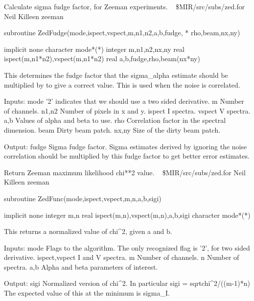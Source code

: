 %
\noindent Calculate sigma fudge factor, for Zeeman experiments.
\newline \ 
\newline {} \$MIR/src/subs/zed.for
\newline {} Neil Killeen
\newline {} zeeman
\par{\tenpoint
{\eightpoint\begintt
        subroutine ZedFudge(mode,ispect,vspect,m,n1,n2,a,b,fudge,
     *                                                  rho,beam,nx,ny)

        implicit none
        character mode*(*)
        integer m,n1,n2,nx,ny
        real ispect(m,n1*n2),vspect(m,n1*n2)
        real a,b,fudge,rho,beam(nx*ny)

  This determines the fudge factor that the sigma_{alpha} estimate
  should be multiplied by to give a correct value. This is used when
  the noise is correlated.

  Inputs:
    mode       '2' indicates that we should use a two sided derivative.
    m          Number of channels.
    n1,n2      Number of pixels in x and y.
    ispect     I spectra.
    vspect     V spectra.
    a,b        Values of alpha and beta to use.
    rho        Correlation factor in the spectral dimension.
    beam       Dirty beam patch.
    nx,ny      Size of the dirty beam patch.

  Output:
    fudge      Sigma fudge factor. Sigma estimates derived by ignoring the
               noise correlation should be multiplied by this fudge factor
               to get better error estimates.
\endtt}
\par}
%
\noindent Return Zeeman maximum likelihood chi**2 value.
\newline \ 
\newline {} \$MIR/src/subs/zed.for
\newline {} Neil Killeen
\newline \abox{Keywords:} zeeman
\par{\tenpoint
{\eightpoint\begintt
        subroutine ZedFunc(mode,ispect,vspect,m,n,a,b,sigi)

        implicit none
        integer m,n
        real ispect(m,n),vspect(m,n),a,b,sigi
        character mode*(*)

  This returns a normalized value of chi^2, given a and b.

  Inputs:
    mode       Flags to the algorithm. The only recognized flag is '2',
               for two sided derivative.
    ispect,vspect I and V spectra.
    m          Number of channels.
    n          Number of spectra.
    a,b        Alpha and beta parameters of interest.

  Output:
    sigi       Normalized version of chi^2. In particular
               sigi = sqrt{chi^2/((m-1)*n)}
               The expected value of this at the minimum is sigma_I.
\endtt}
\par}
